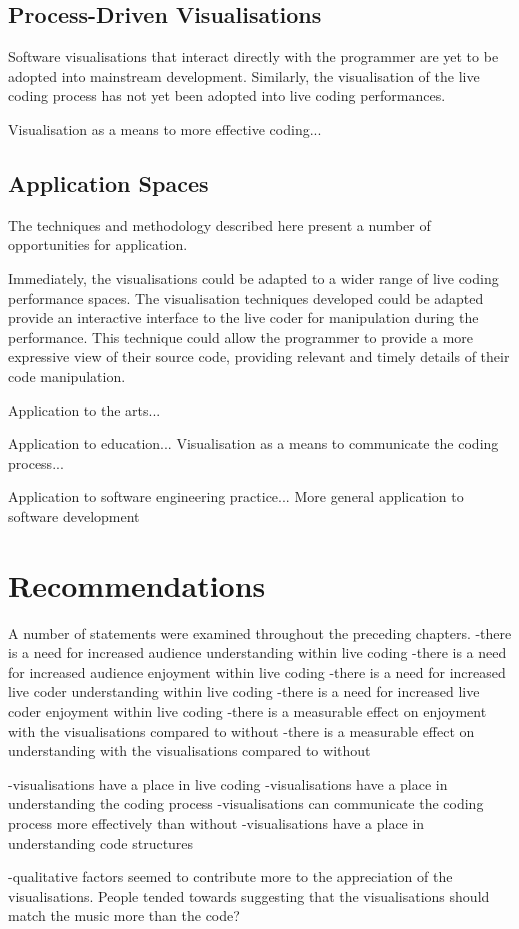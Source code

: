 \subsection{Process-Driven Visualisations}

Software visualisations that interact directly with the programmer are yet to be adopted into mainstream development. Similarly, the visualisation of the live coding process has not yet been adopted into live coding performances.


Visualisation as a means to more effective coding...

\subsection{Application Spaces}

The techniques and methodology described here present a number of opportunities for application.

Immediately, the visualisations could be adapted to a wider range of live coding performance spaces. The visualisation techniques developed could be adapted provide an interactive interface to the live coder for manipulation during the performance. This technique could allow the programmer to provide a more expressive view of their source code, providing relevant and timely details of their code manipulation. 

Application to the arts...

Application to education...
Visualisation as a means to communicate the coding process...

Application to software engineering practice...
More general application to software development


\section{Recommendations}

A number of statements were examined throughout the preceding chapters.
-there is a need for increased audience understanding within live coding
-there is a need for increased audience enjoyment within live coding
-there is a need for increased live coder understanding within live coding
-there is a need for increased live coder enjoyment within live coding
-there is a measurable effect on enjoyment with the visualisations compared to without
-there is a measurable effect on understanding with the visualisations compared to without

-visualisations have a place in live coding
-visualisations have a place in understanding the coding process
-visualisations can communicate the coding process more effectively than without
-visualisations have a place in understanding code structures

-qualitative factors seemed to contribute more to the appreciation of the visualisations. People tended towards suggesting that the visualisations should match the music more than the code?

